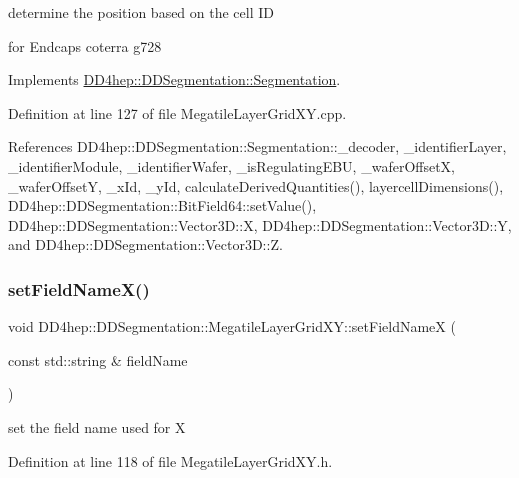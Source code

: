 determine the position based on the cell ID 

for Endcaps coterra g728 

Implements \hyperlink{class_d_d4hep_1_1_d_d_segmentation_1_1_segmentation_a594fe6d78667415855858d083b64acad}{D\+D4hep\+::\+D\+D\+Segmentation\+::\+Segmentation}.



Definition at line 127 of file Megatile\+Layer\+Grid\+X\+Y.\+cpp.



References D\+D4hep\+::\+D\+D\+Segmentation\+::\+Segmentation\+::\+\_\+decoder, \+\_\+identifier\+Layer, \+\_\+identifier\+Module, \+\_\+identifier\+Wafer, \+\_\+is\+Regulating\+E\+BU, \+\_\+wafer\+OffsetX, \+\_\+wafer\+OffsetY, \+\_\+x\+Id, \+\_\+y\+Id, calculate\+Derived\+Quantities(), layercell\+Dimensions(), D\+D4hep\+::\+D\+D\+Segmentation\+::\+Bit\+Field64\+::set\+Value(), D\+D4hep\+::\+D\+D\+Segmentation\+::\+Vector3\+D\+::X, D\+D4hep\+::\+D\+D\+Segmentation\+::\+Vector3\+D\+::Y, and D\+D4hep\+::\+D\+D\+Segmentation\+::\+Vector3\+D\+::Z.

\hypertarget{class_d_d4hep_1_1_d_d_segmentation_1_1_megatile_layer_grid_x_y_a3f1b9a1540d75d71d29df2c0b40da730}{}\label{class_d_d4hep_1_1_d_d_segmentation_1_1_megatile_layer_grid_x_y_a3f1b9a1540d75d71d29df2c0b40da730} 
\subsubsection{\texorpdfstring{set\+Field\+Name\+X()}{setFieldNameX()}}
{\footnotesize\ttfamily void D\+D4hep\+::\+D\+D\+Segmentation\+::\+Megatile\+Layer\+Grid\+X\+Y\+::set\+Field\+NameX (\begin{DoxyParamCaption}\item[{const std\+::string \&}]{field\+Name }\end{DoxyParamCaption})\hspace{0.3cm}{\ttfamily [inline]}}



set the field name used for X 



Definition at line 118 of file Megatile\+Layer\+Grid\+X\+Y.\+h.




